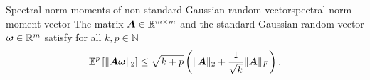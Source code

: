\documentclass[12pt]{article}
\begin{document}
\begin{lemma}{Spectral norm moments of non-standard Gaussian random vector}{spectral-norm-moment-vector}
    The matrix $\boldsymbol{A} \in \mathbb{R}^{m \times m}$ and the standard Gaussian random vector $\boldsymbol{\omega} \in \mathbb{R}^{m}$ satisfy for all $k,p \in \mathbb{N}$ 
    \begin{equation}
        \mathbb{E}^{p}\left[ \lVert \boldsymbol{A} \boldsymbol{\omega} \rVert _2 \right]
        \leq  \sqrt{k + p} \left( \lVert \boldsymbol{A} \rVert _2 + \frac{1}{\sqrt{k}} \lVert \boldsymbol{A} \rVert _F \right).
    \end{equation}
\end{lemma}
\end{document}
